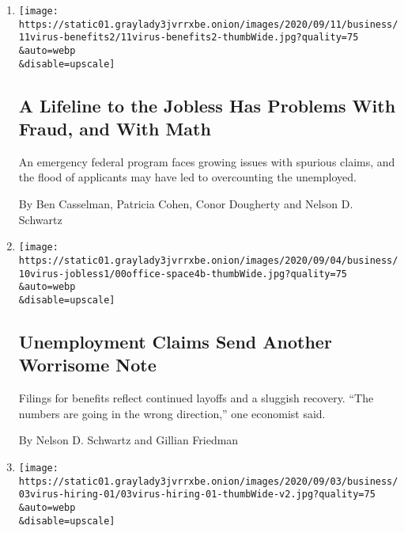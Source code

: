 \begin{enumerate}
\def\labelenumi{\arabic{enumi}.}
\item
  \href{/2020/09/11/business/economy/pandemic-unemployment-assistance-fraud.html}{}

  \texttt{[image: https://static01.graylady3jvrrxbe.onion/images/2020/09/11/business/11virus-benefits2/11virus-benefits2-thumbWide.jpg?quality=75\\\&auto=webp\\\&disable=upscale]}

  \hypertarget{a-lifeline-to-the-jobless-has-problems-with-fraud-and-with-math}{%
  \subsection{A Lifeline to the Jobless Has Problems With Fraud, and
  With
  Math}\label{a-lifeline-to-the-jobless-has-problems-with-fraud-and-with-math}}

  An emergency federal program faces growing issues with spurious
  claims, and the flood of applicants may have led to overcounting the
  unemployed.

  By Ben Casselman, Patricia Cohen, Conor Dougherty and Nelson D.
  Schwartz
\item
  \href{/2020/09/10/business/economy/unemployment-claims.html}{}

  \texttt{[image: https://static01.graylady3jvrrxbe.onion/images/2020/09/04/business/10virus-jobless1/00office-space4b-thumbWide.jpg?quality=75\\\&auto=webp\\\&disable=upscale]}

  \hypertarget{unemployment-claims-send-another-worrisome-note}{%
  \subsection{Unemployment Claims Send Another Worrisome
  Note}\label{unemployment-claims-send-another-worrisome-note}}

  Filings for benefits reflect continued layoffs and a sluggish
  recovery. ``The numbers are going in the wrong direction,'' one
  economist said.

  By Nelson D. Schwartz and Gillian Friedman
\item
  \href{/2020/09/10/business/economy/unemployment-benefits-hiring.html}{}

  \texttt{[image: https://static01.graylady3jvrrxbe.onion/images/2020/09/03/business/03virus-hiring-01/03virus-hiring-01-thumbWide-v2.jpg?quality=75\\\&auto=webp\\\&disable=upscale]}

  \hypertarget{do-jobless-benefits-deter-workers-some-employers-say-yes-studies-dont}{%
}
\end{enumerate}
